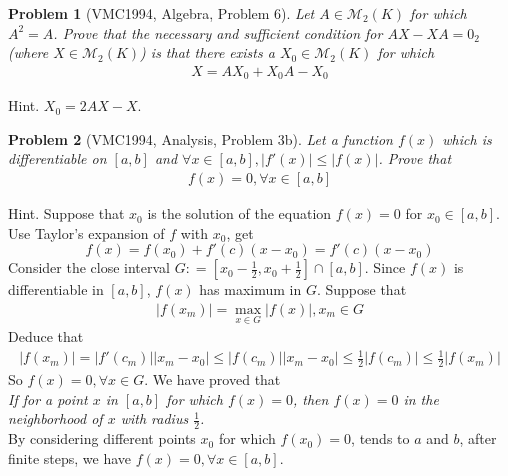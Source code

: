 \documentclass{article}
\newtheorem{problem}{Problem}
\begin{document}
\begin{problem}[VMC1994, Algebra, Problem 6]
	Let $A \in {\mathcal{M}_2}\left( K \right)$ for which $A^2=A$. Prove that the necessary and sufficient condition for $AX-XA=0_2$ (where $X \in {\mathcal{M}_2}\left( K \right)$) is that there exists a $X_0 \in {\mathcal{M}_2}\left( K \right)$ for which
	\begin{align*}
		X = A{X_0} + {X_0}A - {X_0}
	\end{align*}
\end{problem}
{\sf Hint.} ${X_0} = 2AX - X$.

\begin{problem}[VMC1994, Analysis, Problem 3b]
	Let a function $f(x)$ which is differentiable on $[a,b]$ and $\forall x \in \left[ {a,b} \right],\left| {f'\left( x \right)} \right| \le \left| {f\left( x \right)} \right|$. Prove that
	\begin{align}
		f\left( x \right) = 0,\forall x \in \left[ {a,b} \right]
	\end{align}
\end{problem}
{\sf Hint.} Suppose that $x_0$ is the solution of the equation $f(x)=0$ for $x_0 \in [a,b]$. Use Taylor's expansion of $f$ with $x_0$, get
\begin{equation}
	f\left( x \right) = f\left( {{x_0}} \right) + f'\left( c \right)\left( {x - {x_0}} \right) = f'\left( c \right)\left( {x - {x_0}} \right)
\end{equation}
Consider the close interval $G: = \left[ {{x_0} - \frac{1}{2},{x_0} + \frac{1}{2}} \right] \cap \left[ {a,b} \right]$. Since $f(x)$ is differentiable in $[a,b]$, $f(x)$ has maximum in $G$. Suppose that
\begin{align}
	\left| {f\left( {{x_m}} \right)} \right| = \mathop {\max }\limits_{x \in G} \left| {f\left( x \right)} \right|,{x_m} \in G
\end{align}
Deduce that
\begin{align}
	\left| {f\left( {{x_m}} \right)} \right| = \left| {f'\left( {{c_m}} \right)} \right|\left| {{x_m} - {x_0}} \right| \le \left| {f\left( {{c_m}} \right)} \right|\left| {{x_m} - {x_0}} \right| \le \frac{1}{2}\left| {f\left( {{c_m}} \right)} \right| \le \frac{1}{2}\left| {f\left( {{x_m}} \right)} \right|
\end{align}
So $f\left( x \right) = 0,\forall x \in G$. We have proved that\\ \textit{If for a point $x$ in $[a,b]$ for which $f(x)=0$, then $f(x)=0$ in the neighborhood of $x$ with radius $\frac{1}{2}$.}\\
By considering different points $x_0$ for which $f(x_0)=0$, tends to $a$ and $b$, after finite steps, we have $f\left( x \right) = 0,\forall x \in \left[ {a,b} \right]$.
\end{document}
